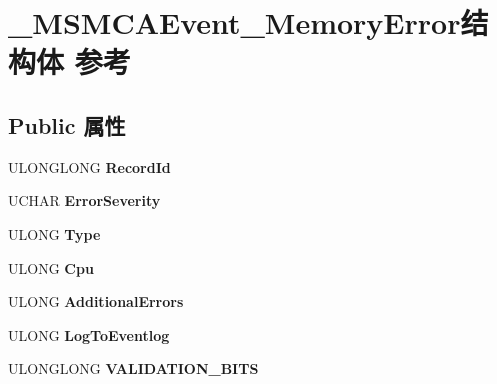 \hypertarget{struct___m_s_m_c_a_event___memory_error}{}\section{\+\_\+\+M\+S\+M\+C\+A\+Event\+\_\+\+Memory\+Error结构体 参考}
\label{struct___m_s_m_c_a_event___memory_error}
\subsection*{Public 属性}
\begin{DoxyCompactItemize}
\item 
\mbox{\label{struct___m_s_m_c_a_event___memory_error_a5135e656cac96dfa7ff7619938a0c179}} 
U\+L\+O\+N\+G\+L\+O\+NG {\bfseries Record\+Id}
\item 
\mbox{\label{struct___m_s_m_c_a_event___memory_error_a1591d4e3d17eef1480c66a8c1573e4a1}} 
U\+C\+H\+AR {\bfseries Error\+Severity}
\item 
\mbox{\label{struct___m_s_m_c_a_event___memory_error_ad90ed52e353a5f8911f1bd576150852f}} 
U\+L\+O\+NG {\bfseries Type}
\item 
\mbox{\label{struct___m_s_m_c_a_event___memory_error_a692952037ee435be182d44b464b347be}} 
U\+L\+O\+NG {\bfseries Cpu}
\item 
\mbox{\label{struct___m_s_m_c_a_event___memory_error_a3374d5207bec4da67a18b2504c2faae4}} 
U\+L\+O\+NG {\bfseries Additional\+Errors}
\item 
\mbox{\label{struct___m_s_m_c_a_event___memory_error_a2f6584e8ebfc9d6df01b1237c63bbfc4}} 
U\+L\+O\+NG {\bfseries Log\+To\+Eventlog}
\item 
\mbox{\label{struct___m_s_m_c_a_event___memory_error_a083b66dfad7e74a47b58194959684b75}} 
U\+L\+O\+N\+G\+L\+O\+NG {\bfseries V\+A\+L\+I\+D\+A\+T\+I\+O\+N\+\_\+\+B\+I\+TS}
\item 

\end{DoxyCompactItemize}
